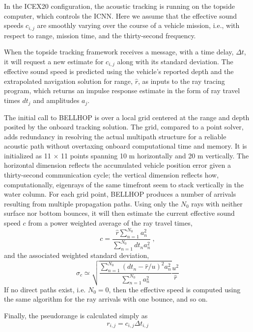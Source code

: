  In the ICEX20 configuration, the acoustic tracking is running on the topside computer, which controls the ICNN.
Here we assume that the effective sound speeds $c_{i,j}$ are smoothly varying over the course of a vehicle mission, i.e., with respect to range, mission time, and the thirty-second frequency.

 When the topside tracking framework receives a message, with a time delay, $\Delta t$, it will request a new estimate for $c_{i,j}$ along with its standard deviation.
The effective sound speed is predicted using the vehicle's reported depth and the extrapolated navigation solution for range, $\hat{r}$, as inputs to the ray tracing program, which returns an impulse response estimate in the form of ray travel times $dt_{j}$ and amplitudes $a_{j}$.

 The initial call to BELLHOP is over a local grid centered at the range and depth posited by the onboard tracking solution.
The grid, compared to a point solver, adds redundancy in resolving the actual multipath structure for a reliable acoustic path without overtaxing onboard computational time and memory.
It is initialized as 11 $\times$ 11 points spanning 10 m horizontally and 20 m vertically.
The horizontal dimension reflects the accumulated vehicle position error given a thirty-second communication cycle; the vertical dimension reflects how, computationally, eigenrays of the same timefront seem to stack vertically in the water column. 
For each grid point, BELLHOP produces a number of arrivals resulting from multiple propagation paths.
Using only the $N_0$ rays with neither surface nor bottom bounces, it will then estimate the current effective sound speed $c$ from a power weighted average of the ray travel times,
\begin{equation}
c = \frac{\hat{r} \sum_{n=1}^{N_{0}} a_{n}^{2}}{\sum_{n=1}^{N_{0}} dt_{n}a_{n}^{2}} ~, 
\end{equation}
and the associated weighted standard deviation,
\begin{equation}
\sigma_{c} \simeq \sqrt{\frac {\sum_{n=1}^{N_{0}} (dt_{n}-\hat{r}/u)^{2}a_{n}^{2}}{ \sum_{n=1}^{N_{0}} a_{n}^{2}} } \frac{u^{2}}{\hat{r}}
\end{equation}
If no direct paths exist, i.e. $N_{0}=0$, then the effective speed is computed using the same algorithm for the ray arrivals with one bounce, and so on.

Finally, the pseudorange is calculated simply as
\begin{equation}
r_{i,j} = c_{i,j} \Delta t_{i,j} 
\end{equation}

